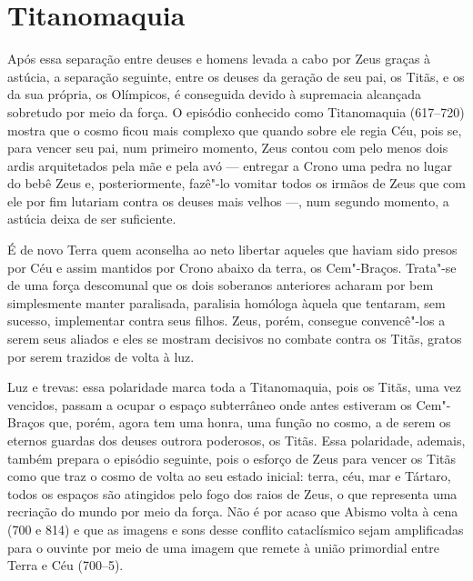 \section{Titanomaquia}

Após essa separação entre deuses e homens levada a cabo por Zeus graças
à astúcia, a separação seguinte, entre os deuses da geração de seu pai,
os Titãs, e os da sua própria, os Olímpicos, é conseguida devido à
supremacia alcançada sobretudo por meio da força. O episódio conhecido
como Titanomaquia (617--720) mostra que o cosmo ficou mais complexo que
quando sobre ele regia Céu, pois se, para vencer seu pai, num primeiro
momento, Zeus contou com pelo menos dois ardis arquitetados pela mãe e
pela avó --- entregar a Crono uma pedra no lugar do bebê Zeus e,
posteriormente, fazê"-lo vomitar todos os irmãos de Zeus que com ele por
fim lutariam contra os deuses mais velhos ---, num segundo momento, a
astúcia deixa de ser suficiente.

É de novo Terra quem aconselha ao neto libertar aqueles que haviam sido
presos por Céu e assim mantidos por Crono abaixo da terra, os
Cem"-Braços. Trata"-se de uma força descomunal que os dois soberanos
anteriores acharam por bem simplesmente manter paralisada, paralisia
homóloga àquela que tentaram, sem sucesso, implementar contra seus
filhos. Zeus, porém, consegue convencê"-los a serem seus aliados e eles
se mostram decisivos no combate contra os Titãs, gratos por serem
trazidos de volta à luz.

Luz e trevas: essa polaridade marca toda a Titanomaquia, pois os Titãs,
uma vez vencidos, passam a ocupar o espaço subterrâneo onde antes
estiveram os Cem"-Braços que, porém, agora tem uma honra, uma função no
cosmo, a de serem os eternos guardas dos deuses outrora poderosos, os
Titãs. Essa polaridade, ademais, também prepara o episódio seguinte,
pois o esforço de Zeus para vencer os Titãs como que traz o cosmo de
volta ao seu estado inicial: terra, céu, mar e Tártaro, todos os espaços
são atingidos pelo fogo dos raios de Zeus, o que representa uma
recriação do mundo por meio da força. Não é por acaso que Abismo volta à
cena (700 e 814) e que as imagens e sons desse conflito cataclísmico
sejam amplificadas para o ouvinte por meio de uma imagem que remete à
união primordial entre Terra e Céu (700--5).

